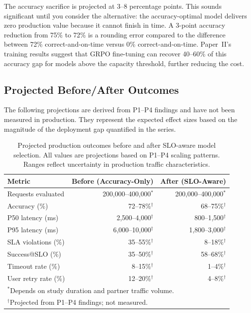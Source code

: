 \documentclass[11pt]{article}
\begin{document}
The accuracy sacrifice is projected at 3--8 percentage points. This sounds significant until you consider the alternative: the accuracy-optimal model delivers zero production value because it cannot finish in time. A 3-point accuracy reduction from 75\% to 72\% is a rounding error compared to the difference between 72\% correct-and-on-time versus 0\% correct-and-on-time. Paper~II's training results suggest that GRPO fine-tuning can recover 40--60\% of this accuracy gap for models above the capacity threshold, further reducing the cost.

\subsection{Projected Before/After Outcomes}

The following projections are derived from P1--P4 findings and have not been measured in production. They represent the expected effect sizes based on the magnitude of the deployment gap quantified in the series.

\begin{table}[t]
\centering
\caption{Projected production outcomes before and after SLO-aware model selection. All values are projections based on P1--P4 scaling patterns. Ranges reflect uncertainty in production traffic characteristics.}
\label{tab:before-after}
\small
\begin{tabular}{lrr}
\toprule
\textbf{Metric} & \textbf{Before (Accuracy-Only)} & \textbf{After (SLO-Aware)} \\
\midrule
Requests evaluated & 200,000--400,000$^{*}$ & 200,000--400,000$^{*}$ \\
Accuracy (\%) & 72--78\%$^\dagger$ & 68--75\%$^\dagger$ \\
P50 latency (ms) & 2,500--4,000$^\dagger$ & 800--1,500$^\dagger$ \\
P95 latency (ms) & 6,000--10,000$^\dagger$ & 1,800--3,000$^\dagger$ \\
SLA violations (\%) & 35--55\%$^\dagger$ & 8--18\%$^\dagger$ \\
Success@SLO (\%) & 35--50\%$^\dagger$ & 58--68\%$^\dagger$ \\
Timeout rate (\%) & 8--15\%$^\dagger$ & 1--4\%$^\dagger$ \\
User retry rate (\%) & 12--20\%$^\dagger$ & 4--8\%$^\dagger$ \\
\bottomrule
\multicolumn{3}{l}{\footnotesize $^{*}$Depends on study duration and partner traffic volume.} \\
\multicolumn{3}{l}{\footnotesize $^\dagger$Projected from P1--P4 findings; not measured.}
\end{tabular}
\end{table}
\end{document}
